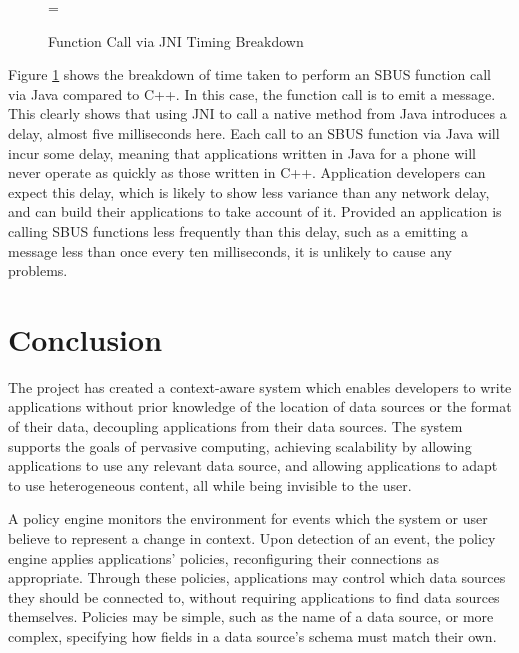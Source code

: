 \documentclass[12pt,twoside,notitlepage]{report}
\begin{document}
\begin{figure}[tbh]
\epsfxsize=\hsize
\centerline{}
\caption{Function Call via JNI Timing Breakdown}
\label{fig:jni_times}
\end{figure}

Figure \ref{fig:jni_times} shows the breakdown of time taken to perform an SBUS function call via Java compared to C++. 
In this case, the function call is to emit a message. 
This clearly shows that using JNI to call a native method from Java introduces a delay, almost five milliseconds here. 
Each call to an SBUS function via Java will incur some delay, meaning that applications written in Java for a phone will never operate as quickly as those written in C++.
Application developers can expect this delay, which is likely to show less variance than any network delay, and can build their applications to take account of it. 
Provided an application is calling SBUS functions less frequently than this delay, such as a emitting a message less than once every ten milliseconds, it is unlikely to cause any problems.





\cleardoublepage

\chapter{Conclusion}

The project has created a context-aware system which enables developers to write applications without prior knowledge of the location of data sources or the format of their data, decoupling applications from their data sources. 
The system supports the goals of pervasive computing, achieving scalability by allowing applications to use any relevant data source, and allowing applications to adapt to use heterogeneous content, all while being invisible to the user.

A policy engine monitors the environment for events which the system or user believe to represent a change in context.
Upon detection of an event, the policy engine applies applications' policies, reconfiguring their connections as appropriate. 
Through these policies, applications may control which data sources they should be connected to, without requiring applications to find data sources themselves.
Policies may be simple, such as the name of a data source, or more complex, specifying how fields in a data source's schema must match their own. 
\end{document}
